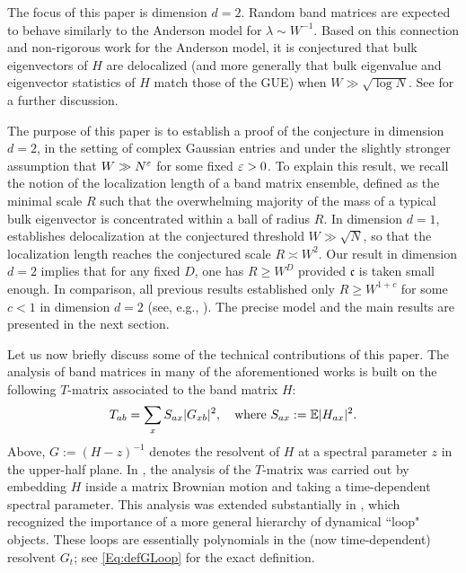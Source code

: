 The focus of this paper is dimension $d=2$. Random band matrices are expected to behave similarly to the Anderson model for $\lambda\sim W^{-1}$. Based on this connection and non-rigorous work \cite{PRL_Anderson} for the Anderson model, it is conjectured that bulk eigenvectors of $H$ are delocalized (and more generally that bulk eigenvalue and eigenvector statistics of $H$ match those of the GUE) when $W\gg\sqrt{\log N}$. See \cite{PB_review,Spencer1,Spencer2,Spencer3} for a further discussion.



The purpose of this paper is to establish a proof of the conjecture in dimension $d=2$, in the setting of complex Gaussian entries and under the slightly stronger assumption that $W \gg N^{{\varepsilon}}$ for some fixed ${\varepsilon}>0$. To explain this result, we recall the notion of the localization length of a band matrix ensemble, defined as the minimal scale $R$ such that the overwhelming majority of the mass of a typical bulk eigenvector is concentrated within a ball of radius $R$. In dimension $d=1$, \cite{YY_25} establishes delocalization at the conjectured threshold $W\gg\sqrt{N}$, so that the localization length reaches the conjectured scale $R \asymp W^2$. Our result in dimension $d=2$ implies that for any fixed $D$, one has $R \geq W^D$ provided $\mathfrak{c}$ is taken small enough. In comparison, all previous results established only $R \ge W^{1+c} $ for some $ c < 1$ in  dimension $d=2$ (see, e.g., \cite{ErdKno2011,EK_band1,erdos2013delocalization}). The precise model and the main results are presented in the next section.




Let us now briefly discuss some of the technical contributions of this paper. The analysis of band matrices in many of the aforementioned works is built on the following $T$-matrix associated to the band matrix $H$:
%
\begin{align*}
T_{ab}=\sum_{x}S_{ax}|G_{xb}|^{2}, \quad\text{where } S_{ax}:=\mathbb{E}|H_{ax}|^{2}.
\end{align*}
%
Above, $G:=(H-z)^{-1}$ denotes the resolvent of $H$ at a spectral parameter $z$ in the upper-half plane. In \cite{DY}, the analysis of the $T$-matrix was carried out by embedding $H$ inside a matrix Brownian motion and taking a time-dependent spectral parameter. This analysis was extended substantially in \cite{YY_25}, which recognized the importance of a more general hierarchy of dynamical ``loop" objects. These loops are essentially polynomials in the (now time-dependent) resolvent $G_{t}$; see \eqref{Eq:defGLoop} for the exact definition. 

